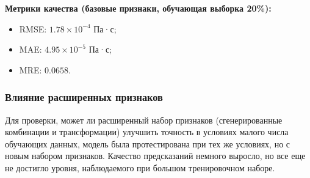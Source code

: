 \documentclass[a4paper,12pt]{article}
\begin{document}
    \vspace{5mm}
      \begin{minipage}{\textwidth}
        \textbf{Метрики качества (базовые признаки, обучающая выборка 20\%):}
        \begin{itemize}
          \item RMSE: \( 1.78 \times 10^{-4} \) Па·с;
          \item MAE: \( 4.95 \times 10^{-5} \) Па·с;
          \item MRE: \( 0.0658 \).
        \end{itemize}
      \end{minipage}

    \subsubsection{Влияние расширенных признаков}

      Для проверки, может ли расширенный набор признаков (сгенерированные комбинации и трансформации) улучшить точность в условиях малого числа обучающих данных, модель была протестирована при тех же условиях, но с новым набором признаков. Качество предсказаний немного выросло, но все еще не достигло уровня, наблюдаемого при большом тренировочном наборе.
      
\end{document}
